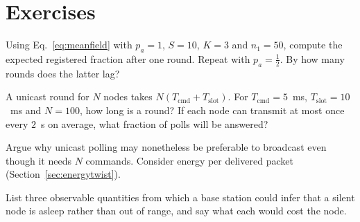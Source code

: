 \section*{Exercises}
\begin{exercise}
Using Eq.~\eqref{eq:meanfield} with $p_a=1$, $S=10$, $K=3$ and $n_1=50$, compute the expected registered fraction after one round. Repeat with $p_a=\tfrac12$. By how many rounds does the latter lag?
\end{exercise}
\begin{exercise}
A unicast round for $N$ nodes takes $N(T_{\mathrm{cmd}}+T_{\mathrm{slot}})$. For $T_{\mathrm{cmd}}=5$~ms, $T_{\mathrm{slot}}=10$~ms and $N=100$, how long is a round? If each node can transmit at most once every $2$~s on average, what fraction of polls will be answered?
\end{exercise}
\begin{exercise}
Argue why unicast polling may nonetheless be preferable to broadcast even though it needs $N$ commands. Consider energy per delivered packet (Section~\ref{sec:energytwist}).
\end{exercise}
\begin{exercise}
List three observable quantities from which a base station could infer that a silent node is asleep rather than out of range, and say what each would cost the node.
\end{exercise}
